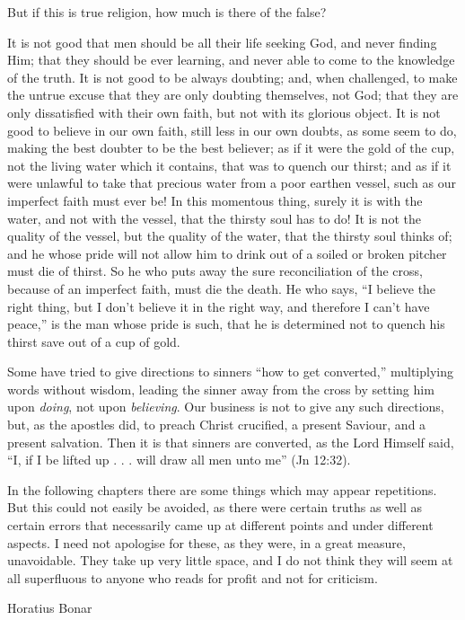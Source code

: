 \documentclass[
]{book}
\begin{document}
But if this is true religion, how much is there of the false?

It is not good that men should be all their life seeking God, and never finding Him; that they should be ever learning, and never able to come to the knowledge of the truth. It is not good to be always doubting; and, when challenged, to make the untrue excuse that they are only doubting themselves, not God; that they are only dissatisfied with their own faith, but not with its glorious object. It is not good to believe in our own faith, still less in our own doubts, as some seem to do, making the best doubter to be the best believer; as if it were the gold of the cup, not the living water which it contains, that was to quench our thirst; and as if it were unlawful to take that precious water from a poor earthen vessel, such as our imperfect faith must ever be! In this momentous thing, surely it is with the water, and not with the vessel, that the thirsty soul has to do! It is not the quality of the vessel, but the quality of the water, that the thirsty soul thinks of; and he whose pride will not allow him to drink out of a soiled or broken pitcher must die of thirst. So he who puts away the sure reconciliation of the cross, because of an imperfect faith, must die the death. He who says, ``I believe the right thing, but I don't believe it in the right way, and therefore I can't have peace,'' is the man whose pride is such, that he is determined not to quench his thirst save out of a cup of gold.

Some have tried to give directions to sinners ``how to get converted,'' multiplying words without wisdom, leading the sinner away from the cross by setting him upon \emph{doing}, not upon \emph{believing}. Our business is not to give any such directions, but, as the apostles did, to preach Christ crucified, a present Saviour, and a present salvation. Then it is that sinners are converted, as the Lord Himself said, ``I, if I be lifted up . . . will draw all men unto me'' (Jn 12:32).

In the following chapters there are some things which may appear repetitions. But this could not easily be avoided, as there were certain truths as well as certain errors that necessarily came up at different points and under different aspects. I need not apologise for these, as they were, in a great measure, unavoidable. They take up very little space, and I do not think they will seem at all superfluous to anyone who reads for profit and not for criticism.

Horatius Bonar
\end{document}
